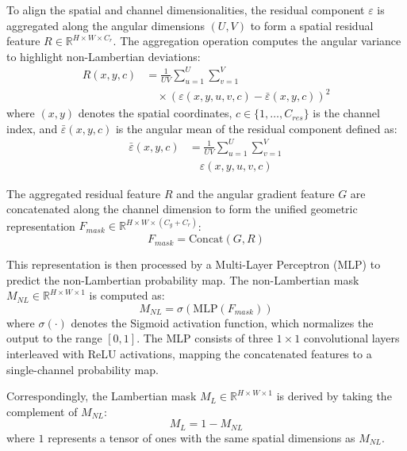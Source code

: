 \documentclass[lettersize,journal]{IEEEtran}
\begin{document}
To align the spatial and channel dimensionalities, the residual component $\varepsilon$ is aggregated along the angular dimensions $(U, V)$ to form a spatial residual feature $R \in \mathbb{R}^{H \times W \times C_r}$. The aggregation operation computes the angular variance to highlight non-Lambertian deviations:
\begin{equation}
\begin{aligned}
R(x,y,c) &= \frac{1}{UV} \sum_{u=1}^{U} \sum_{v=1}^{V} \\
&\quad \times \left( \varepsilon(x,y,u,v,c) - \bar{\varepsilon}(x,y,c) \right)^2
\end{aligned}
\end{equation}
where $(x,y)$ denotes the spatial coordinates, $c \in \{1, \dots, C_{res}\}$ is the channel index, and $\bar{\varepsilon}(x,y,c)$ is the angular mean of the residual component defined as:
\begin{equation}
\begin{aligned}
\bar{\varepsilon}(x,y,c) &= \frac{1}{UV} \sum_{u=1}^{U} \sum_{v=1}^{V} \\
&\quad \varepsilon(x,y,u,v,c)
\end{aligned}
\end{equation}

The aggregated residual feature $R$ and the angular gradient feature $G$ are concatenated along the channel dimension to form the unified geometric representation $F_{mask} \in \mathbb{R}^{H \times W \times (C_g + C_r)}$:
\begin{equation}
F_{mask} = \text{Concat}(G, R)
\end{equation}

This representation is then processed by a Multi-Layer Perceptron (MLP) to predict the non-Lambertian probability map. The non-Lambertian mask $M_{NL} \in \mathbb{R}^{H \times W \times 1}$ is computed as:
\begin{equation}
M_{NL} = \sigma(\text{MLP}(F_{mask}))
\end{equation}
where $\sigma(\cdot)$ denotes the Sigmoid activation function, which normalizes the output to the range $[0, 1]$. The MLP consists of three $1 \times 1$ convolutional layers interleaved with ReLU activations, mapping the concatenated features to a single-channel probability map.

Correspondingly, the Lambertian mask $M_L \in \mathbb{R}^{H \times W \times 1}$ is derived by taking the complement of $M_{NL}$:
\begin{equation}
M_L = 1 - M_{NL}
\end{equation}
where $1$ represents a tensor of ones with the same spatial dimensions as $M_{NL}$.
\end{document}

